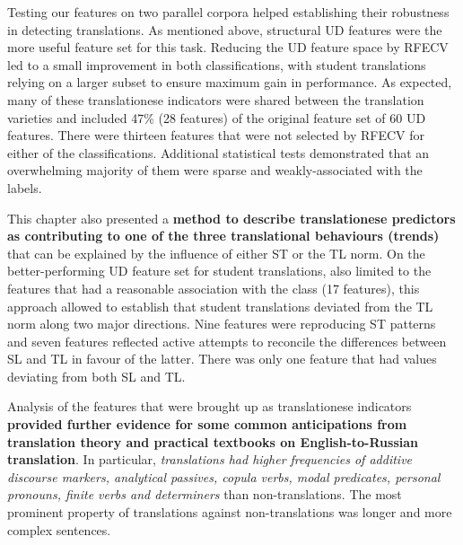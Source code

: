 Testing our features on two parallel corpora helped establishing their robustness in detecting translations. 
As mentioned above, structural UD features were the more useful feature set for this task.
Reducing the UD feature space by RFECV led to a small improvement in both classifications, with student translations relying on a larger subset to ensure maximum gain in performance. As expected, many of these translationese indicators were shared between the translation varieties and included 47\% (28 features) of the original feature set of 60 UD features.
There were thirteen features that were not selected by RFECV for either of the classifications. Additional statistical tests demonstrated that an overwhelming majority of them were sparse and weakly-associated with the labels. 

This chapter also presented a \textbf{method to describe translationese predictors as contributing to one of the three translational behaviours (trends)} that can be explained by the influence of either ST or the TL norm. On the better-performing UD feature set for student translations, also limited to the features that had a reasonable association with the class (17 features), this approach allowed to establish that student translations deviated from the TL norm along two major directions. Nine features were reproducing ST patterns and seven features reflected active attempts to reconcile the differences between SL and TL in favour of the latter. 
There was only one feature that had values deviating from both SL and TL. 

Analysis of the features that were brought up as translationese indicators \textbf{provided further evidence for some common anticipations from translation theory and practical textbooks on English-to-Russian translation}. In particular, \textit{translations had higher frequencies of additive discourse markers, analytical passives, copula verbs, modal predicates, personal pronouns, finite verbs and determiners} than non-translations. The most prominent property of translations against non-translations was longer and more complex sentences. 

